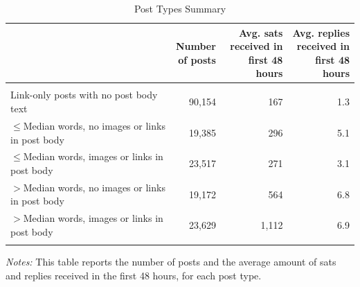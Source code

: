 \begin{table}[H]
\centering
\caption{Post Types Summary}
\vspace{0.2cm}
\label{tbl_post_types_summary}
\begin{adjustbox}{max width=\textwidth}
\begin{threeparttable}
\begin{tabular}{lrrr}
\toprule
& \makecell{Number\\of posts} & \makecell{Avg. sats\\received in\\first 48 hours} & \makecell{Avg. replies\\received in\\first 48 hours} \\ \midrule
& & & \\
Link-only posts with no post body text & 90,154 & 167 & 1.3 \\ [1ex]
$\leq$Median words, no images or links in post body & 19,385 & 296 & 5.1 \\ [1ex]
$\leq$Median words, images or links in post body & 23,517 & 271 & 3.1 \\ [1ex]
$>$Median words, no images or links in post body & 19,172 & 564 & 6.8 \\ [1ex]
$>$Median words, images or links in post body & 23,629 & 1,112 & 6.9 \\ [1ex]

& & & \\
\bottomrule
\end{tabular}
\begin{tablenotes}
\item {\textit{Notes: } This table reports the number of posts and the average amount of sats and replies received in the first 48 hours, for each post type.}
\end{tablenotes}
\end{threeparttable}
\end{adjustbox}
\end{table}
